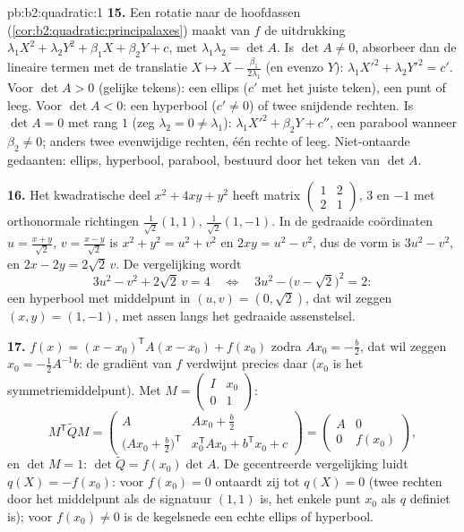 \begin{solution}{pb:b2:quadratic:1}
\textbf{15.} Een rotatie naar de hoofdassen
(\cref{cor:b2:quadratic:principalaxes}) maakt van $f$ de uitdrukking
$\lambda_1X^2 + \lambda_2Y^2 + \beta_1X + \beta_2Y + c$, met
$\lambda_1\lambda_2 = \det A$. Is $\det A \neq 0$, absorbeer dan de
lineaire termen met de translatie $X \mapsto X -
\frac{\beta_1}{2\lambda_1}$ (en evenzo $Y$): $\lambda_1X'^2
+ \lambda_2Y'^2 = c'$. Voor $\det A > 0$ (gelijke tekens): een
ellips ($c'$ met het juiste teken), een punt of leeg. Voor $\det
A < 0$: een hyperbool ($c' \neq 0$) of twee snijdende rechten. Is
$\det A = 0$ met rang $1$ (zeg $\lambda_2 = 0 \neq \lambda_1$):
$\lambda_1X'^2 + \beta_2Y + c''$, een parabool wanneer $\beta_2
\neq 0$; anders twee evenwijdige rechten, één rechte of leeg.
Niet-ontaarde gedaanten: ellips, hyperbool, parabool, bestuurd door
het teken van $\det A$.

\textbf{16.} Het kwadratische deel $x^2 + 4xy + y^2$ heeft matrix
$\begin{pmatrix}1 & 2\\ 2 & 1\end{pmatrix}$,  $3$ en
$-1$ met orthonormale richtingen $\frac{1}{\sqrt2}(1,1)$,
$\frac{1}{\sqrt2}(1,-1)$. In de gedraaide coördinaten $u =
\frac{x+y}{\sqrt2}$, $v = \frac{x-y}{\sqrt2}$ is $x^2 + y^2 = u^2
+ v^2$ en $2xy = u^2 - v^2$, dus de vorm is $3u^2 - v^2$, en $2x
- 2y = 2\sqrt2\,v$. De vergelijking wordt
\[
3u^2 - v^2 + 2\sqrt2\,v = 4
\quad\Longleftrightarrow\quad
3u^2 - \bigl(v - \sqrt2\bigr)^2 = 2 :
\]
een hyperbool met middelpunt in $(u, v) = (0, \sqrt2)$, dat wil
zeggen $(x, y) = (1, -1)$, met assen langs het gedraaide
assenstelsel.

\textbf{17.} $f(x) = (x - x_0)^{\mathsf T}A(x - x_0) + f(x_0)$
zodra $Ax_0 = -\frac b2$, dat wil zeggen $x_0 = -\frac12A^{-1}b$:
de gradiënt van $f$ verdwijnt precies daar ($x_0$ is het
symmetriemiddelpunt). Met $M = \begin{pmatrix} I & x_0\\ 0 &
1\end{pmatrix}$:
\[
M^{\mathsf T}\widetilde QM
= \begin{pmatrix}
A & Ax_0 + \frac b2\\[2pt]
\bigl(Ax_0 + \frac b2\bigr)^{\mathsf T} &
x_0^{\mathsf T}Ax_0 + b^{\mathsf T}x_0 + c
\end{pmatrix}
= \begin{pmatrix} A & 0\\ 0 & f(x_0)\end{pmatrix},
\]
en $\det M = 1$: $\det\widetilde Q = f(x_0)\det A$. De gecentreerde
vergelijking luidt $q(X) = -f(x_0)$: voor $f(x_0) = 0$ ontaardt zij
tot $q(X) = 0$ (twee rechten door het middelpunt als de signatuur
$(1,1)$ is, het enkele punt $x_0$ als $q$ definiet is); voor
$f(x_0) \neq 0$ is de kegelsnede een echte ellips of hyperbool.


\end{solution}

